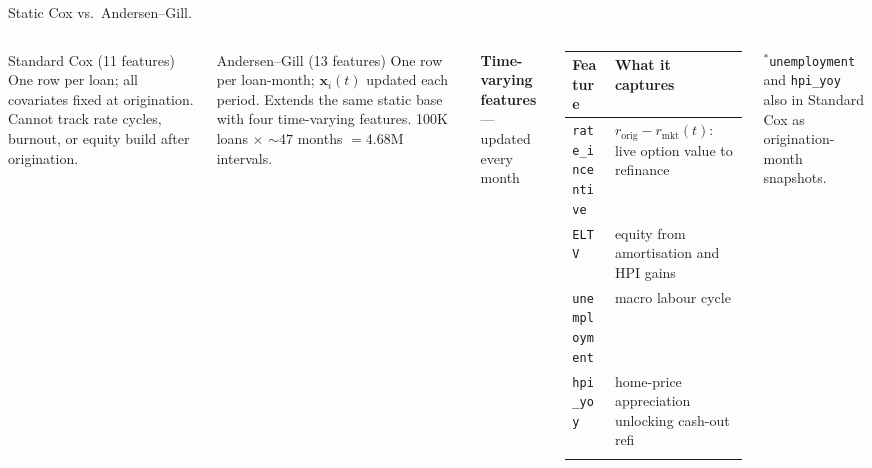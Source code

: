 \documentclass[10pt,aspectratio=169]{beamer}
\begin{document}
\begin{frame}{Static Cox vs.\ Andersen--Gill.}
    \begin{columns}[T,onlytextwidth]

        \begin{block}{Standard Cox (11 features)}
        \small\vspace{2pt}
        One row per loan; all covariates fixed at origination.
        Cannot track rate cycles, burnout, or equity build after origination.
        \vspace{2pt}
        \end{block}

        \vspace{0.5em}

        \begin{block}{Andersen--Gill (13 features)}
        \small\vspace{2pt}
        One row per loan-month; $\mathbf{x}_i(t)$ updated each period.
        Extends the same static base with four time-varying
        features. 100K loans $\times$ ${\sim}47$ months $= 4.68$M intervals.
        \vspace{2pt}
        \end{block}

        \vspace{0.2em}
        \small\textbf{Time-varying features} --- updated every month
        \vspace{0.4em}

        \begin{tabular}{@{}p{2.5cm}p{4.1cm}@{}}
            \toprule
            \textbf{Feature} & \textbf{What it captures} \\
            \midrule
            \addlinespace[2pt]
            \texttt{rate\_incentive} & $r_{\text{orig}}{-}r_{\text{mkt}}(t)$: live option value to refinance \\
            \addlinespace[4pt]
            \texttt{ELTV}            & equity from amortisation and HPI gains \\
            \addlinespace[4pt]
            \texttt{unemployment}    & macro labour cycle \\
            \addlinespace[4pt]
            \texttt{hpi\_yoy}        & home-price appreciation unlocking cash-out refi \\
            \addlinespace[2pt]
            \bottomrule
        \end{tabular}

        \vspace{0.5em}
        \footnotesize $^*$\texttt{unemployment} and \texttt{hpi\_yoy} also in Standard Cox as origination-month snapshots.

    \end{columns}
\end{frame}
\end{document}
